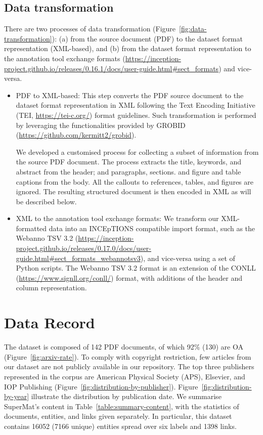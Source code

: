 \documentclass[]{interact}
\theoremstyle{plain}%
\theoremstyle{definition}
\theoremstyle{remark}
\begin{document}
\subsection{Data transformation}
\label{subsec:transformation-of-data}
There are two processes of data transformation (Figure~\ref{fig:data-transformation}): (a) from the source document (PDF) to the dataset format representation (XML-based), and (b) from the dataset format representation to the annotation tool exchange formats (\url{https://inception-project.github.io/releases/0.16.1/docs/user-guide.html\#sect_formats}) and vice-versa. 
\begin{itemize}
    \item PDF to XML-based: This step converts the PDF source document to the dataset format representation in XML following the Text Encoding Initiative (TEI, \url{https://tei-c.org/}) format guidelines. 
    Such transformation is performed by leveraging the functionalities provided by GROBID (\url{https://github.com/kermitt2/grobid}).
    
    We developed a customised process for collecting a subset of information from the source PDF document.
    The process extracts the title, keywords, and abstract from the header; and paragraphs, sections. and figure and table captions from the body.
    All the callouts to references, tables, and figures are ignored.
    The resulting structured document is then encoded in XML as will be described below. 
    \item XML to the annotation tool exchange formats: We transform our XML-formatted data into an INCEpTIONS compatible import format, such as the Webanno TSV 3.2 (\url{https://inception-project.github.io/releases/0.17.0/docs/user-guide.html\#sect_formats_webannotsv3}), and vice-versa using a set of Python scripts. 
    The Webanno TSV 3.2 format is an extension of the CONLL (\url{https://www.signll.org/conll/}) format, with additions of the header and column representation.
\end{itemize}

\section{Data Record}
\label{sec:data-record}
The dataset is composed of 142 PDF documents, of which 92\% (130) are OA (Figure~\ref{fig:arxiv-rate}).
To comply with copyright restriction, few articles from our dataset are not publicly available in our repository. 
The top three publishers represented in the corpus are American Physical Society (APS), Elsevier, and IOP Publishing (Figure~\ref{fig:distribution-by-publisher}).
Figure~\ref{fig:distribution-by-year} illustrate the distribution by publication date.
We summarise SuperMat's content in Table~\ref{table:summary-content}, with the statistics of documents, entities, and links given separately. In particular, this dataset contains 16052 (7166 unique) entities spread over six labels and 1398 links. 
\end{document}
